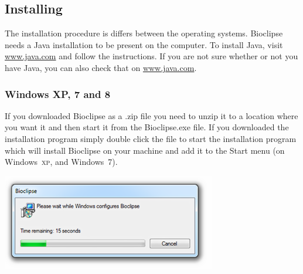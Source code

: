 \documentclass[a5paper, 10pt]{memoir}
\begin{document}
\begin{refsection}
\begin{center}
\end{center}

\subsection{Installing}
The installation procedure is differs between the operating systems. Bioclipse
needs a Java installation to be present on the computer. To install Java, visit
\url{www.java.com} and follow the instructions. If you are not sure whether or
not you have Java, you can also check that on \url{www.java.com}.

\subsubsection{Windows XP, 7 and 8}
If you downloaded Bioclipse as a .zip file you need to unzip it to a location
where you want it and then start it from the Bioclipse.exe file. If you
downloaded the installation program simply double click the file to start the
installation program which will install Bioclipse on your machine and add it to
the Start menu (on Windows~\textsc{xp}, and Windows~7).
\begin{center}
\includegraphics[width=0.7\textwidth]{images/WindowsInstaller.png}
\end{center}

\end{refsection}
\end{document}
